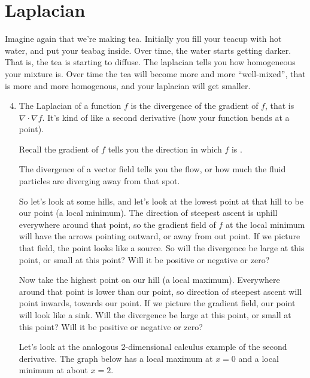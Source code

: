\documentclass[11pt]{article}
\begin{document}
\newpage

\section*{Laplacian}
Imagine again that we're making tea.  Initially you fill your teacup with hot water, and put your teabag inside.  Over time, the water starts getting darker.  That is, the tea is starting to diffuse.  The laplacian tells you how homogeneous your mixture is.  Over time the tea will become more and more ``well-mixed'', that is more and more homogenous, and your laplacian will get smaller.  
\begin{enumerate}\setcounter{enumi}{3}
\item  The Laplacian of a function $f$ is the divergence of the gradient of $f$, that is $\nabla \cdot \nabla f$.  It's kind of like a second derivative (how your function bends at a point).  

Recall the gradient of $f$ tells you the direction in which $f$ is \underline{\hspace{6cm}}.

The divergence of a vector field tells you the flow, or how much the fluid particles are diverging away from that spot.  

So let's look at some hills, and let's look at the lowest point at that hill to be our point (a local minimum).  The direction of steepest ascent is uphill everywhere around that point, so the gradient field of $f$ at the local minimum will have the arrows pointing outward, or away from out point.  If we picture that field, the point looks like a source.  So will the divergence be large at this point, or small at this point?  Will it be positive or negative or zero?

\vspace{2cm}


Now take the highest point on our hill (a local maximum).  Everywhere around that point is lower than our point, so direction of steepest ascent will point inwards, towards our point.  If we picture the gradient field, our point will look like a sink.  Will the divergence be large at this point, or small at this point?  Will it be positive or negative or zero?

\vspace{2cm}

Let's look at the analogous 2-dimensional calculus example of the second derivative.  The graph below has a local maximum at $x=0$ and a local minimum at about $x=2$.   


\end{enumerate}
\end{document}
